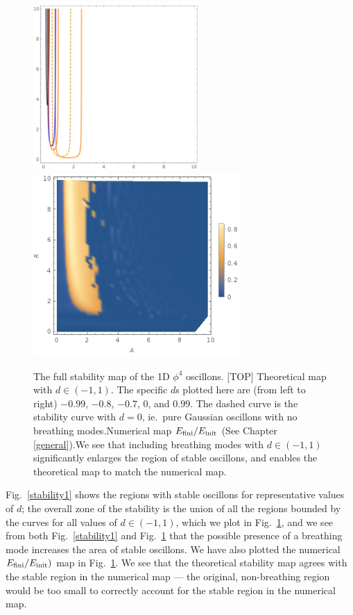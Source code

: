 \documentclass[11pt]{book}
\begin{document}
\begin{figure}\centering
  \hskip-20pt\includegraphics[width=0.56\textwidth]{plot/full-phi4-theory.pdf}\\\vskip12pt
  \includegraphics[width=0.7\textwidth]{plot/energy-ratio-phi4-1d.png}
  \caption{The full stability map of the 1D $\phi^4$ oscillons. [TOP] Theoretical map with $d\in(-1,1)$. The specific $d$s plotted here are (from left to right) $-0.99$, $-0.8$, $-0.7$, $0$, and $0.99$. The dashed curve is the stability curve with $d=0$, ie.~pure Gaussian oscillons with no breathing modes.\quad [DOWN] Numerical map $E_{\rm fini}/E_{\rm init}$ (See Chapter \ref{general}).\qquad We see that including breathing modes with $d\in(-1,1)$ significantly enlarges the region of stable oscillons, and enables the theoretical map to match the numerical map.}\label{stabilityfull}
\end{figure}

Fig.~\ref{stability1} shows the regions with stable oscillons for representative values of $d$; the overall zone of the stability is the union of all the regions bounded by the curves for all values of $d\in(-1,1)$, which we plot in Fig.~\ref{stabilityfull}, and we see from both Fig.~\ref{stability1} and Fig.~\ref{stabilityfull} that the possible presence of a breathing mode increases the area of stable oscillons. We have also plotted the numerical $E_{\rm fini}/E_{\rm init})$ map in Fig.~\ref{stabilityfull}. We see that the theoretical stability map agrees with the stable region in the numerical map --- the original, non-breathing region would be too small to correctly account for the stable region in the numerical map.
\end{document}
